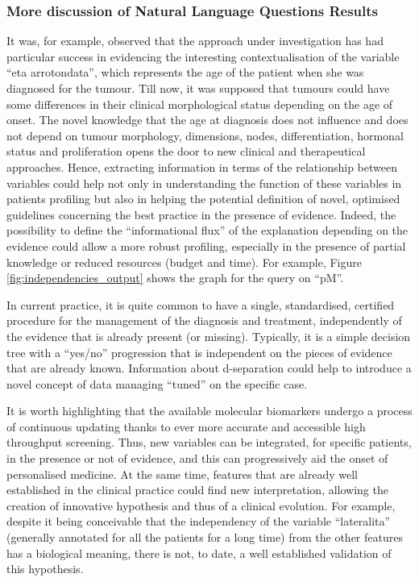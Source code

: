 \subsubsection{More discussion of Natural Language Questions Results}
It was, for example, observed that the approach under investigation has had particular success in evidencing the interesting contextualisation of the variable \enquote{eta arrotondata}, which represents the age of the patient when she was diagnosed for the tumour. 
Till now, it was supposed that tumours could have some differences in their clinical morphological status depending on the age of onset. 
The novel knowledge that the age at diagnosis does not influence and does not depend on tumour morphology, dimensions, nodes, differentiation, hormonal status and proliferation opens the door to new clinical and therapeutical approaches. 
Hence, extracting information in terms of the relationship between variables could help not only in understanding the function of these variables in patients profiling but also in helping the potential definition of novel, optimised guidelines concerning the best practice in the presence of evidence. 
Indeed, the possibility to define the \enquote{informational flux} of the explanation depending on the evidence could allow a more robust profiling, especially in the presence of partial knowledge or reduced resources (budget and time).
For example, Figure \ref{fig:independencies_output} shows the graph for the query on \enquote{pM}.

In current practice, it is quite common to have a single, standardised, certified procedure for the management of the diagnosis and treatment, independently of the evidence that is already present (or missing). 
Typically, it is a simple decision tree with a \enquote{yes/no} progression that is independent on the pieces of evidence that are already known. 
Information about d-separation could help to introduce a novel concept of data managing \enquote{tuned} on the specific case.

It is worth highlighting that the available molecular biomarkers undergo a process of continuous updating thanks to ever more accurate and accessible high throughput screening. 
Thus, new variables can be integrated, for specific patients, in the presence or not of evidence, and this can progressively aid the onset of personalised medicine. 
At the same time, features that are already well established in the clinical practice could find new interpretation, allowing the creation of innovative hypothesis and thus of a clinical evolution. 
For example, despite it being conceivable that the independency of the variable \enquote{lateralita} (generally annotated for all the patients for a long time) from the other features has a biological meaning, there is not, to date, a well established validation of this hypothesis. 


